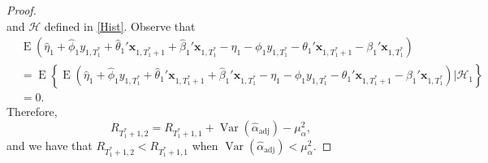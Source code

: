 \documentclass[11pt]{article}
\newcommand{\x}{\textbf{x}}
\newcommand{\Hist}{\mathcal{H}}
\DeclareMathOperator{\E}{E}
\DeclareMathOperator{\Var}{Var}
\begin{document}
\begin{proof}
$$$$
and $\Hist$ defined in \eqref{Hist}.  Observe that 
\begin{align*}
  &\E\left(\hat\eta_1 + \hat\phi_1 y_{1,T_1^*} + \hat\theta_1'\x_{1,T_1^*+1} 
    + \hat\beta_1'\x_{1,T_1^*} - \eta_1 - \phi_1 y_{1,T_1^*} 
    - \theta_1'\x_{1,T_1^*+1} - \beta_1'\x_{1,T_1^*}\right) \\
  &= \E\left\{\E\left(\hat\eta_1 + \hat\phi_1 y_{1,T_1^*} 
    + \hat\theta_1'\x_{1,T_1^*+1} + \hat\beta_1'\x_{1,T_1^*} - \eta_1 
    - \phi_1 y_{1,T_1^*} - \theta_1'\x_{1,T_1^*+1} 
    - \beta_1'\x_{1,T_1^*}\right)|\Hist_1\right\} \\
  &= 0.
\end{align*}
Therefore,
$$
  R_{T_1^*+1, 2} = R_{T_1^*+1, 1} + \Var(\hat{\alpha}_{\text{adj}}) - \mu_{\alpha}^2,
$$ 
and we have that $R_{T_1^*+1, 2} < R_{T_1^*+1, 1}$ when 
$\Var(\hat{\alpha}_{\text{adj}}) < \mu_{\alpha}^2$.
\end{proof}
\end{document}
